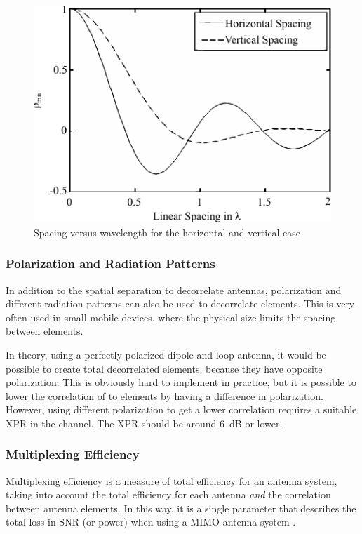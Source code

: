 \begin{figure}[htbp]
  \centering
  \includegraphics[scale=1.2]{img/analysis/mimoSpacing}
  \caption{Spacing versus wavelength for the horizontal and vertical case\cite{Tim2012Practical}}
  \label{fig:mimo-spacing}
\end{figure}

\subsubsection{Polarization and Radiation Patterns}
In addition to the spatial separation to decorrelate antennas, polarization and different radiation patterns can also be used to decorrelate elements. This is very often used in small mobile devices, where the physical size limits the spacing between elements.  

In theory, using a perfectly polarized dipole and loop antenna, it would be possible to create total decorrelated elements, because they have opposite polarization. This is obviously hard to implement in practice, but it is possible to lower the correlation of to elements by having a difference in polarization. However, using different polarization to get a lower correlation requires a suitable XPR in the channel. The XPR should be around \SI{6}{dB} or lower\cite{Tim2012Practical}. 

\subsubsection{Multiplexing Efficiency}

Multiplexing efficiency is a measure of total efficiency for an antenna system, taking into account the total efficiency for each antenna \emph{and} the correlation between antenna elements. In this way, it is a single parameter that describes the total loss in SNR (or power) when using a MIMO antenna system \cite{tian2011multiplexing}.

